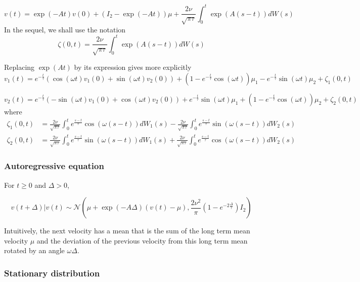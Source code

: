 \documentclass[11pt]{article}
\newcommand {\1}{\mathbb{1}}
\begin{document}
\begin{equation}
	v(t)=\exp(-At) v(0)+ (I_2-\exp(-At))\mu +\frac{2\nu}{\sqrt{\pi \tau}}\int_{0}^{t} \exp(A(s-t)) dW(s)
	\label{eq: RACVM solution}
\end{equation}
In the sequel, we shall use the notation 
\[\zeta(0,t) =\frac{2\nu}{\sqrt{\pi \tau}}\int_{0}^{t} \exp(A(s-t)) dW(s)\] 

Replacing $\exp(At)$ by its expression gives more explicitly
\begin{equation}
	v_1(t)=e^{-\frac{t}{\tau}} \left(\cos(\omega t)v_1(0)+\sin(\omega t)v_2(0)\right)+(1-e^{-\frac{t}{\tau}}\cos(\omega t))\mu_1-e^{-\frac{t}{\tau}} \sin(\omega t) \mu_2 +\zeta_1(0,t)
	\label{eq: first random component RACVM}
\end{equation}


\begin{equation}
	v_2(t)=e^{-\frac{t}{\tau}} \left(-\sin(\omega t)v_1(0)+\cos(\omega t)v_2(0)\right)+e^{-\frac{t}{\tau}} \sin(\omega t) \mu_1+(1-e^{-\frac{t}{\tau}}\cos(\omega t))\mu_2 +\zeta_2(0,t)
	\label{eq: second random component RACVM}
\end{equation}
where \begin{align*}
	\zeta_1(0,t)&=\frac{2\nu}{\sqrt{\pi \tau}} \int_0^t e^{\frac{s-t}{\tau}} \cos(\omega(s-t)) dW_1(s) -\frac{2\nu}{\sqrt{\pi \tau}} \int_0^t e^{\frac{s-t}{\tau}} \sin(\omega(s-t)) dW_2(s) \\
	\zeta_2(0,t)&=\frac{2\nu}{\sqrt{\pi \tau}} \int_0^t e^{\frac{s-t}{\tau}} \sin(\omega(s-t)) dW_1(s) +\frac{2\nu}{\sqrt{\pi \tau}} \int_0^t e^{\frac{s-t}{\tau}} \cos(\omega(s-t)) dW_2(s)
\end{align*}
\subsubsection{Autoregressive equation}

For $t \geq 0$ and $\Delta >0$, 

\[v(t+\Delta) \vert v(t) \sim \mathcal{N}\left( \mu + \exp(-A\Delta)(v(t)-\mu), \frac{2\nu^2}{\pi}(1-e^{-2\frac{\Delta}{\tau}}) I_2 \right) \]

Intuitively, the next velocity has a mean that is the sum of the long term mean velocity $\mu$ and the deviation of the previous velocity from this long term mean rotated by an angle $\omega \Delta$.
\subsubsection{Stationary distribution}
\end{document}
